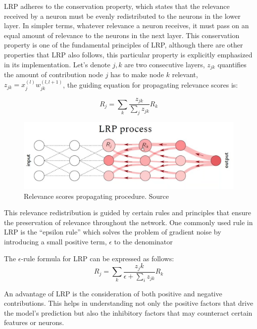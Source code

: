LRP adheres to the conservation property, which states that the relevance received by a neuron must be evenly redistributed to the neurons in the lower layer. In simpler terms, whatever relevance a neuron receives, it must pass on an equal amount of relevance to the neurons in the next layer. This conservation property is one of the fundamental principles of LRP, although there are other properties that LRP also follows, this particular property is explicitly emphasized in its implementation. Let's denote $j, k$ are two consecutive layers, $z_{jk}$ quantifies the amount of contribution node $j$ has to make node $k$ relevant, $z_{jk} = x_j^{(l)}w_{jk}^{(l, l+1)}$, the guiding equation for propagating relevance scores is:

\begin{equation}
\label{equation:conservation}
    R_j = \sum_{k}{\frac{z_{jk}}{\sum_j{z_{jk}}}}R_k
\end{equation}

\begin{figure}[hbt!]
\centering
\includegraphics[width=13cm]{images/xai_methods/lrp.png}
\caption{Relevance scores propagating procedure. Source \cite{lrp}}
\end{figure}

This relevance redistribution is guided by certain rules and principles that ensure the preservation of relevance throughout the network. One commonly used rule in LRP is the ``epsilon rule'' which solves the problem of gradient noise by introducing a small positive term, $\epsilon$ to the denominator

The $\epsilon$-rule formula for LRP can be expressed as follows:
\begin{equation}
    R_j = \sum_{k}{\frac{z_jk}{\epsilon + \sum_i{z_{jk}}}}R_k
\end{equation}

An advantage of LRP is the consideration of both positive and negative contributions. This helps in understanding not only the positive factors that drive the model's prediction but also the inhibitory factors that may counteract certain features or neurons.

